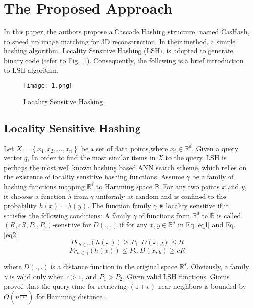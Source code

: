 \documentclass[10pt,twocolumn,letterpaper]{article}
\begin{document}
\section{The Proposed Approach}
In this paper, the authors propose a Cascade Hashing structure, named CasHash, to speed up image matching for 3D reconstruction. In their method, a simple hashing algorithm, Locality Sensitive Hashing (LSH), is adopted to generate binary code (refer to Fig.~\ref{fig1}). Consequently, the following is  a brief introduction to LSH algorithm.
\begin{figure}[t]
  \centering
  \texttt{[image: 1.png]}\\
  \caption{Locality Sensitive Hashing}\label{fig1}
\end{figure}

\subsection{Locality Sensitive Hashing}
Let $X = \left \{ x_1,x_2,...,x_n\right \}$ be a set of data points,where $x_i \in \mathbb{R}^d$. Given a query vector $q$, In order to find the most similar items in $X$ to the query. LSH is perhaps the most well known hashing based ANN search scheme, which relies on the existence of locality sensitive hashing functions. Assume $\gamma$ be a family of hashing functions mapping $\mathbb{R}^d$ to Hamming space $\mathbb{B}$. For any two points $x$ and $y$, it chooses a function $h$ from $\gamma$  uniformly at random and is confined to the probability $h\left( x \right) = h\left( y \right)$. The function family $\gamma$ is locality sensitive if it satisfies the following conditions: A family $\gamma$ of functions from $\mathbb{R}^d$ to $\mathbb{B}$ is called $(R,cR,P_1,P_2)$-sensitive for $D\left(.,.\right)$ if for any $ x,y \in \mathbb{R}^d$ in Eq.\ref{eq1} and Eq.\ref{eq2}.
\begin{equation}
Pr_{h \in \gamma}\left(h\left(x \right)\right) \geq P_1,D\left(x,y\right) \leq R
\label{eq1}
\end{equation}
\begin{equation}
Pr_{h \in \gamma}\left(h\left (x \right)\right) \leq P_2,D\left(x,y\right) \geq cR
\label{eq2}
\end{equation}
\par
where $D\left(.,.\right)$ is a distance function in the original space
$\mathbb{R}^d$. Obviously, a family $\gamma$ is valid only when $c > 1$, and
$P_1 > P_2$. Given valid LSH functions, Gionis  proved
that the query time for retrieving $\left(1+\epsilon\right)$-near neighbors is
bounded by $O\left(n^{\frac{1}{1+\epsilon}}\right)$ for Hamming distance \cite{gionis1999similarity}.

{\small


}

 
\end{document}
